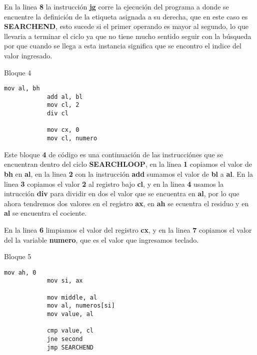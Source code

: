 \documentclass[a4paper,twoside]{article}
\newcommand{\codebordo}[1]{\textcolor{codebordo}{#1}}
\newcommand{\codeblue}[1]{\textcolor{codeblue}{#1}}
\begin{document}
      {\Large En la linea \textbf{8} la instrucción \codeblue{\textbf{jg}} corre la ejecución del programa a donde se encuentre la definición 
          de la etiqueta asignada a su derecha, que en este caso es \codeblue{\textbf{SEARCHEND}}, esto sucede si el primer operando es mayor
          al segundo, lo que llevaria a terminar el ciclo ya que no tiene mucho sentido seguir con la búsqueda por que cuando se llega a esta 
          instancia significa que se encontro el indice del valor ingresado.
      }
    \newpage  
    \vspace*{-2cm}
    \begin{center}
      {\normalsize Bloque 4}
      \begin{lstlisting}[language=8086]
            mov al, bh
            add al, bl
            mov cl, 2
            div cl
            
            mov cx, 0
            mov cl, numero
      \end{lstlisting}
    \end{center} 
      \vspace*{0.5cm}
      {\Large Este bloque \textbf{4} de código es una continuación de las instrucciónes que se encuentran dentro del ciclo
        \codeblue{\textbf{SEARCHLOOP}}, en la linea \textbf{1} copiamos el valor de \codebordo{\textbf{bh}} 
        en \codebordo{\textbf{al}}, en la linea \textbf{2} con la instrucción \codeblue{\textbf{add}} sumamos
        el valor de \codebordo{\textbf{bl}} a \codebordo{\textbf{al}}. 
        En la linea \textbf{3} copiamos el valor \textbf{2} al registro bajo \codebordo{\textbf{cl}},
        y en la linea \textbf{4} usamos la intrucción \codeblue{\textbf{div}} para dividir en dos el valor que se encuentra
        en \codebordo{\textbf{al}}, por lo que ahora tendremos dos valores en el registro \codebordo{\textbf{ax}},
        en \codebordo{\textbf{ah}} se ecuentra el residuo y en \codebordo{\textbf{al}} se encuentra el cociente.
      }

      {\Large En la linea \textbf{6} limpiamos el valor del registro \codebordo{\textbf{cx}},
        y en la linea \textbf{7} copiamos el valor del la variable \textbf{numero}, que es el valor que ingresamos 
        teclado.
      }

    \vspace*{1cm}

    \begin{center}
      {\normalsize Bloque 5}
      \begin{lstlisting}[language=8086]
            mov ah, 0
            mov si, ax
            
            mov middle, al
            mov al, numeros[si]
            mov value, al
            
            cmp value, cl
            jne second
            jmp SEARCHEND
      \end{lstlisting}
    \end{center} 
\end{document}
